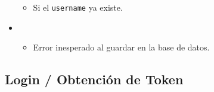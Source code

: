 \documentclass[a4paper,11pt,spanish]{sphinxmanual}
\newcommand{\robotoMonoBold}{\fontseries{b}\selectfont\ttfamily}
\renewcommand{\sphinxcode}[1]{\textcolor{sphinxorangeCode}{{\robotoMonoBold #1}}}
\renewcommand{\sphinxupquote}[1]{\texttt{#1}}
\begin{document}
\begin{fulllineitems}
\begin{itemize}
\begin{itemize}
\item {} 
\sphinxAtStartPar
Si el \sphinxcode{\sphinxupquote{username}} ya existe.

\end{itemize}

\begin{sphinxVerbatim}[commandchars=\\\{\}]
\end{sphinxVerbatim}

\item {} 
\sphinxAtStartPar
{}
\begin{itemize}
\item {} 
\sphinxAtStartPar
Error inesperado al guardar en la base de datos.

\end{itemize}

\end{itemize}

\end{fulllineitems}



\subsection{Login / Obtención de Token}
\label{\detokenize{endpoints:login-obtencion-de-token}}
\end{document}
